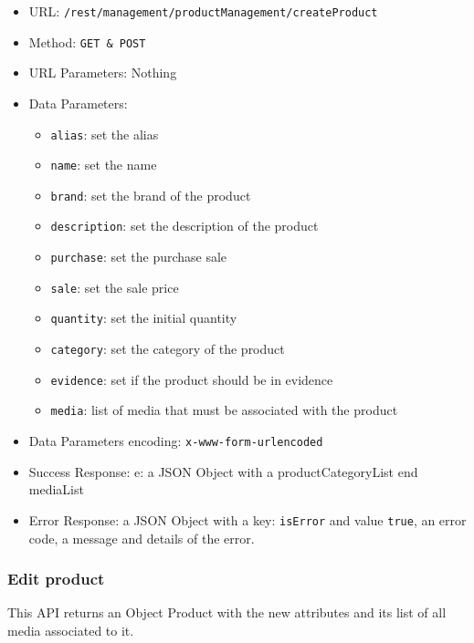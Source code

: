 \begin{itemize}
    \item URL: \texttt{/rest/management/productManagement/createProduct}
    \item Method: \texttt{{GET \& POST}}
    \item URL Parameters: Nothing
    \item Data Parameters: 
    \begin{itemize}
        \item \texttt{alias}: set the alias
        \item \texttt{name}: set the name
        \item \texttt{brand}: set the brand of the product
        \item \texttt{description}: set the description of the product
        \item \texttt{purchase}: set the purchase sale
        \item \texttt{sale}: set the sale price
        \item \texttt{quantity}: set the initial quantity
        \item \texttt{category}: set the category of the product
        \item \texttt{evidence}: set if the product should be in evidence
        \item \texttt{media}: list of media that must be associated with the product
    \end{itemize}
    \item Data Parameters encoding: \texttt{x-www-form-urlencoded}
    \item Success Response: e: a JSON Object with a productCategoryList end mediaList

    \item Error Response: a JSON Object with a key: \texttt{isError}  and value \texttt{true}, an error code, a message and details of the error.
\end{itemize}


\subsubsection*{Edit product}
This API returns an Object Product with the new attributes and its list of all media associated to it.

